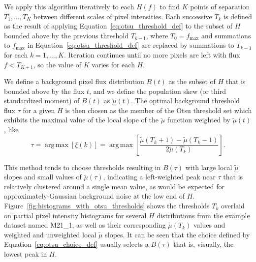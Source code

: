 \documentclass[letterpaper,11pt]{article}
\newcommand{\reffig}[1]{Figure~\ref{#1}}
\newcommand{\refeq}[1]{Equation~\ref{#1}}
\DeclareMathOperator*{\argmax}{arg\,max}
\newcommand{\fmax}{f_{\mathrm{max}}}
\begin{document}
We apply this algorithm iteratively to each $H(f)$ to find $K$ points of separation $T_{1}, \ldots, T_{K}$ between different scales of pixel intensities. Each successive $T_{k}$ is defined as the result of applying \refeq{eq:otsu_threshold_def} to the subset of $H$ bounded above by the previous threshold $T_{k-1}$, where $T_{0}=\fmax$ and summations to $\fmax$ in \refeq{eq:otsu_threshold_def} are replaced by summations to $T_{k-1}$ for each $k=1,\ldots,K$. Iteration continues until no more pixels are left with flux $f<T_{K+1}$, so the value of $K$ varies for each $H$.

We define a background pixel flux distribution $B(t)$ as the subset of $H$ that is bounded above by the flux $t$, and we define the population skew (or third standardized moment) of $B(t)$ as $\widetilde{\mu}(t)$. The optimal background threshold flux $\tau$ for a given $H$ is then chosen as the member of the Otsu threshold set which exhibits the maximal value of the local slope of the $\widetilde{\mu}$ function weighted by $\widetilde{\mu}(t)$, like
\begin{equation}
\tau = \argmax{\left[ \xi(k) \right]} = \argmax{ \left[ \frac{ \widetilde{\mu}(T_{k}+1) - \widetilde{\mu}(T_{k}-1) }{ 2 \widetilde{\mu}(T_{k}) } \right] } .
\label{eq:otsu_choice_def}
\end{equation}

This method tends to choose thresholds resulting in $B(\tau)$ with large local $\widetilde{\mu}$ slopes and small values of $\widetilde{\mu}(\tau)$, indicating a left-weighted peak near $\tau$ that is relatively clustered around a single mean value, as would be expected for approximately-Gaussian background noise at the low end of $H$. \reffig{fig:histograms_with_otsu_thresholds} shows the thresholds $T_{k}$ overlaid on partial pixel intensity histograms for several $H$ distributions from the example dataset named M21\_1, as well as their corresponding $\widetilde{\mu}(T_{k})$ values and weighted and unweighted local $\widetilde{\mu}$ slopes. It can be seen that the choice defined by \refeq{eq:otsu_choice_def} usually selects a $B(\tau)$ that is, visually, the lowest peak in $H$.
\end{document}

